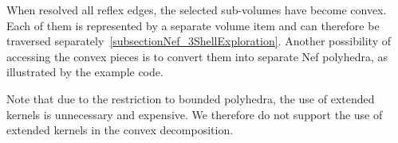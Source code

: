 When  resolved all reflex edges, the
selected sub-volumes have become convex. Each of them is represented
by a separate volume item and can therefore be traversed
separately~\ref{subsectionNef_3ShellExploration}. Another possibility
of accessing the convex pieces is to convert them into separate Nef
polyhedra, as illustrated by the example code.

Note that due to the restriction to bounded polyhedra, the use of
extended kernels is unnecessary and expensive. We therefore do not
support the use of extended kernels in the convex decomposition.

